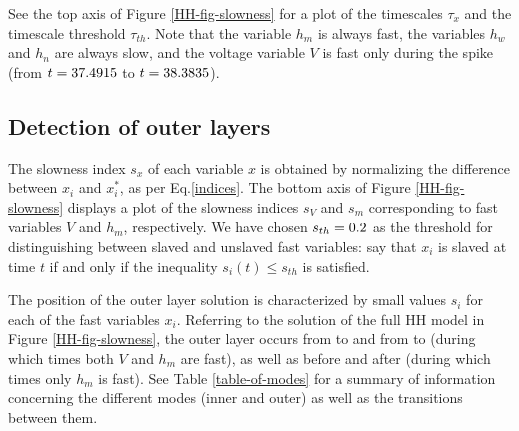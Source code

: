 \documentclass{llncs}
\begin{document}
    See the top axis of Figure \ref{HH-fig-slowness} for a plot of the
    timescales $\tau_x$ and the timescale threshold $\tau_{th}$. Note that the
    variable $h_m$ is always fast, the variables $h_w$ and $h_n$ are always
    slow, and the voltage variable $V$ is fast only during the spike (from
    $t=37.4915$ to $t=38.3835$).


\iffalse\FloatBarrier\fi
\subsection{Detection of outer layers}

    The slowness index $s_x$ of each variable $x$ is obtained  by normalizing
    the difference between $x_i$ and $x_i^*$, as per Eq.\eqref{indices}.
    The bottom axis of Figure \ref{HH-fig-slowness} displays a plot of the
    slowness indices $s_V$ and $s_m$ corresponding to fast variables $V$ and
    $h_m$, respectively. We have chosen $s_{th}=0.2$ as the threshold for
    distinguishing between slaved and unslaved fast variables: say that $x_i$ is
    slaved at time $t$ if and only if the inequality $s_i(t) \leq s_{th}$ is
    satisfied.

    The position of the outer layer solution is characterized by small values
    $s_i$ for each of the fast variables $x_i$. Referring to the solution of the
    full HH model in Figure \ref{HH-fig-slowness}, the outer layer
    occurs from {\Tr} to {\Tt} and from {\Ty} to {\Tu} (during which times both
    $V$ and $h_m$ are fast), as well as before {\Tq} and after {\Tu} (during
    which times only $h_m$ is fast). See Table \ref{table-of-modes} for a
    summary of information concerning the different modes (inner and outer) as
    well as the transitions between them.
\end{document}
